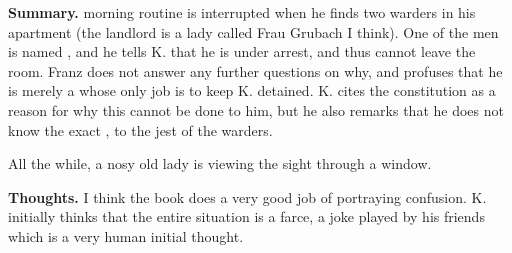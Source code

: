 \textbf{Summary. }  morning routine is interrupted when he finds two
warders in his apartment (the landlord is a lady called Frau Grubach I think).
One of the men is named ,
and he tells K. that he is under arrest, and thus cannot leave the room. Franz
does not answer any further questions on why, and profuses that he is merely a
 whose only job is
to keep K. detained. K. cites the constitution as a reason for why this cannot
be done to him, but he also remarks that he does not know the exact
, to the jest of the
warders.

All the while, a nosy old lady is viewing the sight through a window.

\textbf{Thoughts. } I think the book does a very good job of portraying
confusion. K. initially thinks that the entire situation is a farce, a joke
played by his friends which is a very human initial thought.
